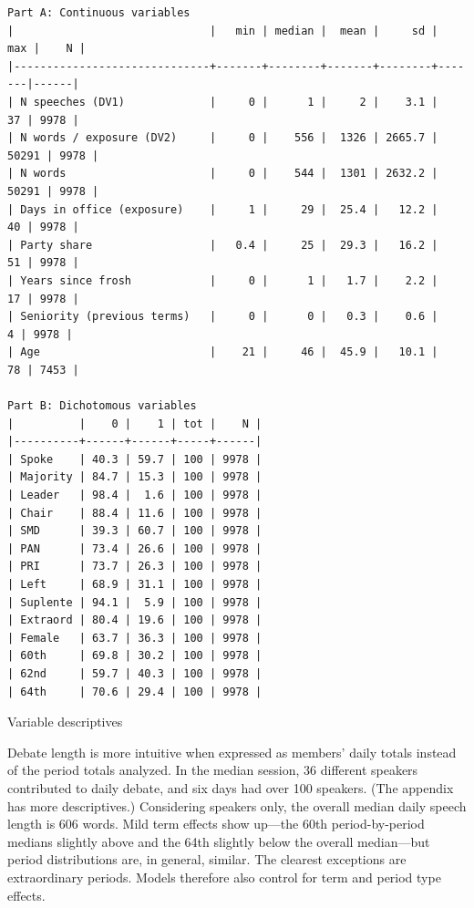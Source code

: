 \documentclass[letter,12pt]{article}
\begin{document}
\begin{table}
  \begin{scriptsize}
    \begin{verbatim}
Part A: Continuous variables
|                              |   min | median |  mean |     sd |   max |    N |
|------------------------------+-------+--------+-------+--------+-------|------|
| N speeches (DV1)             |     0 |      1 |     2 |    3.1 |    37 | 9978 |
| N words / exposure (DV2)     |     0 |    556 |  1326 | 2665.7 | 50291 | 9978 |
| N words                      |     0 |    544 |  1301 | 2632.2 | 50291 | 9978 |
| Days in office (exposure)    |     1 |     29 |  25.4 |   12.2 |    40 | 9978 |
| Party share                  |   0.4 |     25 |  29.3 |   16.2 |    51 | 9978 |
| Years since frosh            |     0 |      1 |   1.7 |    2.2 |    17 | 9978 |
| Seniority (previous terms)   |     0 |      0 |   0.3 |    0.6 |     4 | 9978 |
| Age                          |    21 |     46 |  45.9 |   10.1 |    78 | 7453 |

Part B: Dichotomous variables
|          |    0 |    1 | tot |    N |
|----------+------+------+-----+------|
| Spoke    | 40.3 | 59.7 | 100 | 9978 |
| Majority | 84.7 | 15.3 | 100 | 9978 |
| Leader   | 98.4 |  1.6 | 100 | 9978 |
| Chair    | 88.4 | 11.6 | 100 | 9978 |
| SMD      | 39.3 | 60.7 | 100 | 9978 |
| PAN      | 73.4 | 26.6 | 100 | 9978 |
| PRI      | 73.7 | 26.3 | 100 | 9978 |
| Left     | 68.9 | 31.1 | 100 | 9978 |
| Suplente | 94.1 |  5.9 | 100 | 9978 |
| Extraord | 80.4 | 19.6 | 100 | 9978 |
| Female   | 63.7 | 36.3 | 100 | 9978 |
| 60th     | 69.8 | 30.2 | 100 | 9978 |
| 62nd     | 59.7 | 40.3 | 100 | 9978 |
| 64th     | 70.6 | 29.4 | 100 | 9978 |
    \end{verbatim}
  \end{scriptsize}
\caption{Variable descriptives}\label{T:descriptives}
\end{table}

Debate length is more intuitive when expressed as members' daily totals instead of the period totals analyzed. In the median session, 36 different speakers contributed to daily debate, and six days had over 100 speakers. (The appendix has more descriptives.) Considering speakers only, the overall median daily speech length is 606 words. Mild term effects show up---the 60th period-by-period medians slightly above and the 64th slightly below the overall median---but period distributions are, in general, similar. The clearest exceptions are extraordinary periods. Models therefore also control for term and period type effects.
\end{document}
